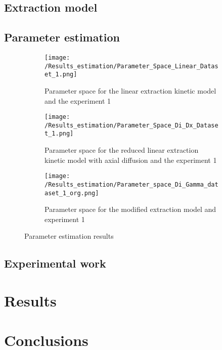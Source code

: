 \documentclass[a4paper,fleqn]{cas-dc}
\begin{document}
\subsection{Extraction model} \label{CH: Extraction_model}


\subsection{Parameter estimation} \label{CH: Parameter_estimation}


\begin{figure*}[!b]
	\centering
	\begin{subfigure}{0.3\textwidth}
		\centering
		\texttt{[image: /Results\_estimation/Parameter\_Space\_Linear\_Dataset\_1.png]}
		\caption{Parameter space for the linear extraction kinetic model and the experiment 1}
		\label{fig: Fit_1_linear}
	\end{subfigure}
	\hfill
	\begin{subfigure}{0.3\textwidth}
		\centering
		\texttt{[image: /Results\_estimation/Parameter\_Space\_Di\_Dx\_Dataset\_1.png]}
		\caption{Parameter space for the reduced linear extraction kinetic model with axial diffusion and the experiment 1}
		\label{fig: Fit_1_Di_Dx}
	\end{subfigure}
	\hfill
	\begin{subfigure}{0.3\textwidth}
		\centering
		\texttt{[image: /Results\_estimation/Parameter\_space\_Di\_Gamma\_dataset\_1\_org.png]}
		\caption{Parameter space for the modified extraction model and experiment 1}
		\label{fig: Fit_1_Di_Gamma}
	\end{subfigure}
	\caption{Parameter estimation results}
\end{figure*}

\subsection{Experimental work}


\section{Results}


\section{Conclusions} \label{CH: Conclusion}
\end{document}
